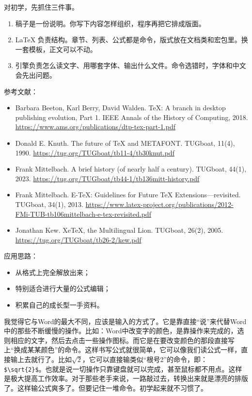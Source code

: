 对初学，先抓住三件事。

\begin{enumerate}
\item 稿子是一份说明。你写下内容怎样组织，程序再把它排成版面。
\item \LaTeX{} 负责结构。章节、列表、公式都是命令，版式放在文档类和宏包里。换一套模板，正文可以不动。
\item 引擎负责怎么读文字、用哪套字体、输出什么文件。命令选错时，字体和中文会先出问题。
\end{enumerate}

参考文献：
\begin{itemize}
\item Barbara Beeton, Karl Berry, David Walden. \TeX: A branch in desktop publishing evolution, Part 1. IEEE Annals of the History of Computing, 2018. \url{https://www.ams.org/publications/dtp-tex-part-1.pdf}
\item Donald E. Knuth. The future of \TeX{} and METAFONT. TUGboat, 11(4), 1990. \url{https://tug.org/TUGboat/tb11-4/tb30knut.pdf}
\item Frank Mittelbach. A brief history (of nearly half a century). TUGboat, 44(1), 2023. \url{https://tug.org/TUGboat/tb44-1/tb136mitt-history.pdf}
\item Frank Mittelbach. E-\TeX: Guidelines for Future \TeX{} Extensions---revisited. TUGboat, 34(1), 2013. \url{https://www.latex-project.org/publications/2012-FMi-TUB-tb106mittelbach-e-tex-revisited.pdf}
\item Jonathan Kew. Xe\TeX, the Multilingual Lion. TUGboat, 26(2), 2005. \url{https://tug.org/TUGboat/tb26-2/kew.pdf}
\end{itemize}

应用思路：
\begin{itemize}
\item 从格式上完全解放出来；
\item 特别适合进行大量的公式编辑；
\item 积累自己的成长型一手资料。
\end{itemize}

我觉得它与Word的最大不同，应该是输入的方式了。它是靠直接“说”来代替Word中的那些不断缓慢的操作。比如：Word中改变字的颜色，是靠操作来完成的，选则相应的文字，然后去点击一些操作图标。而它是在要改变颜色的那段直接写上“换成某某颜色”的命令。这样书写公式就很简单，它可以像我们读公式一样，直接输上去就行了。比如$\sqrt{2}$，它可以直接输类似“根号2”的命令，即：\verb|$\sqrt{2}$|。也就是说一切操作只靠键盘就可以完成，甚至鼠标都不用点。这样是极大提高工作效率。对于那些老手来说，一路敲过去，转换出来就是漂亮的排版了。这样输公式爽多了。但要记住一堆命令。初学起来就不习惯了。

